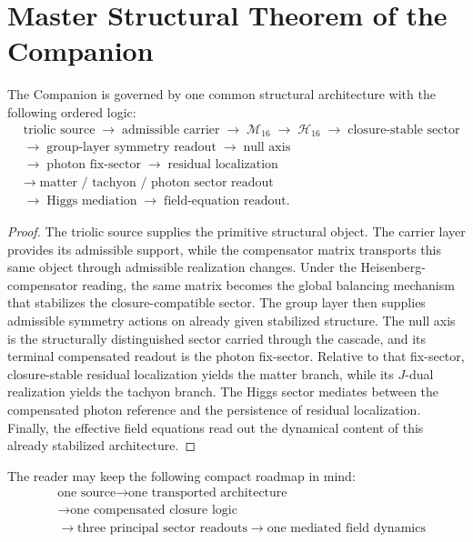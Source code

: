 \section{Master Structural Theorem of the Companion}
\label{sec:master-structural-theorem}


\begin{theorem}
\label{thm:master-structural}
The Companion is governed by one common structural architecture with the
following ordered logic:
\[
\begin{aligned}
&\text{triolic source}
 \;\longrightarrow\;
 \text{admissible carrier}
 \;\longrightarrow\;
 \mathcal M_{16}
 \;\longrightarrow\;
 \mathcal H_{16}
 \;\longrightarrow\;
 \text{closure-stable sector}\\[0.2em]
&\longrightarrow\;\text{group-layer symmetry readout}
 \;\longrightarrow\;\text{null axis}\\[0.2em]
&\longrightarrow\;\text{photon fix-sector}
 \;\longrightarrow\;\text{residual localization}\\[0.2em]
&\longrightarrow\;\text{matter / tachyon / photon sector readout}\\[0.2em]
&\longrightarrow\;\text{Higgs mediation}
 \;\longrightarrow\;\text{field-equation readout}.
\end{aligned}
\]
\end{theorem}

\begin{proof}
The triolic source supplies the primitive structural object. The carrier layer
provides its admissible support, while the compensator matrix transports this
same object through admissible realization changes. Under the
Heisenberg-compensator reading, the same matrix becomes the global balancing
mechanism that stabilizes the closure-compatible sector. The group layer then
supplies admissible symmetry actions on already given stabilized structure.
The null axis is the structurally distinguished sector carried through the
cascade, and its terminal compensated readout is the photon fix-sector.
Relative to that fix-sector, closure-stable residual localization yields the
matter branch, while its $J$-dual realization yields the tachyon branch. The
Higgs sector mediates between the compensated photon reference and the
persistence of residual localization. Finally, the effective field equations
read out the dynamical content of this already stabilized architecture.
\end{proof}

\begin{remark}
The reader may keep the following compact roadmap in mind:
\[
\boxed{\begin{aligned}
{}&\text{one source} \to \text{one transported architecture}\\
{}&\to \text{one compensated closure logic}\\
{}&\to \text{three principal sector readouts} \to \text{one mediated field dynamics}
\end{aligned}}
\]
\end{remark}

